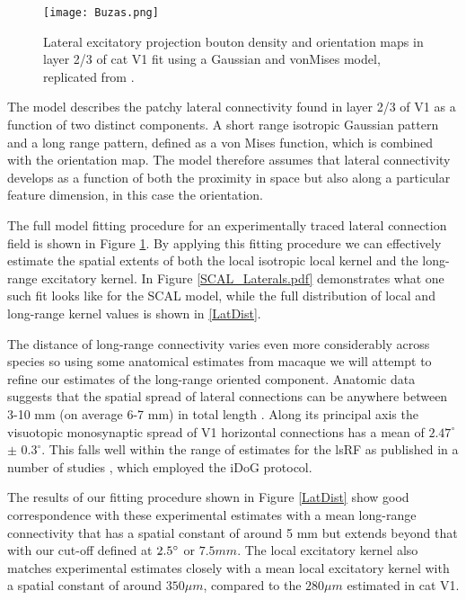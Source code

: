 \begin{figure}
	\centering
        \texttt{[image: Buzas.png]}
	\caption{Lateral excitatory projection bouton density and
          orientation maps in layer 2/3 of cat V1 fit using a Gaussian
          and vonMises model, replicated from \cite{Buzas2006}.}
	\label{Buzas}
\end{figure}

The model describes the patchy lateral connectivity found in layer 2/3
of V1 as a function of two distinct components. A short range
isotropic Gaussian pattern and a long range pattern, defined as a von
Mises function, which is combined with the orientation map. The model
therefore assumes that lateral connectivity develops as a function of
both the proximity in space but also along a particular feature
dimension, in this case the orientation.


The full model fitting procedure for an experimentally traced lateral
connection field is shown in Figure \ref{Buzas}. By applying this
fitting procedure we can effectively estimate the spatial extents of
both the local isotropic local kernel and the long-range excitatory
kernel. In Figure \ref{SCAL_Laterals.pdf} demonstrates what one such
fit looks like for the SCAL model, while the full distribution of
local and long-range kernel values is shown in \ref{LatDist}.

The distance of long-range connectivity varies even more considerably
across species so using some anatomical estimates from macaque we will
attempt to refine our estimates of the long-range oriented
component. Anatomic data suggests that the spatial spread of lateral
connections can be anywhere between 3-10 mm (on average 6-7 mm) in
total length \cite{Angelucci2002}. Along its principal axis the
visuotopic monosynaptic spread of V1 horizontal connections has a mean
of \(2.47^\circ\) \(\pm\) \(0.3^\circ\). This falls well within the
range of estimates for the lsRF as published in a number of studies
\cite{Sceniak1999, Sceniak2001, Shushruth2009}, which employed the
iDoG protocol.

The results of our fitting procedure shown in Figure \ref{LatDist}
show good correspondence with these experimental estimates with a mean
long-range connectivity that has a spatial constant of around 5 mm but
extends beyond that with our cut-off defined at $2.5\degree$ or $7.5
mm$. The local excitatory kernel also matches experimental estimates
closely with a mean local excitatory kernel with a spatial constant of
around $350 \mu m$, compared to the $280 \mu m$ estimated in cat V1.

